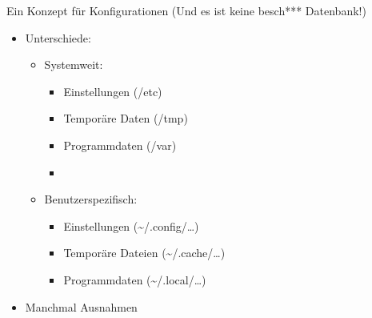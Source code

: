 \begin{frame}{Ein Konzept für Konfigurationen \tiny (Und es ist keine besch*** Datenbank!)}
\begin{itemize}
\item Unterschiede:
	\begin{itemize}
	\item Systemweit:
		\begin{itemize}
		\item Einstellungen (/etc)
		\item Temporäre Daten (/tmp)
		\item Programmdaten (/var)
		\item 
		\end{itemize}
	\item Benutzerspezifisch:
	\begin{itemize}
		\item Einstellungen (\textasciitilde/.config/…)
		\item Temporäre Dateien (\textasciitilde/.cache/…)
		\item Programmdaten (\textasciitilde/.local/…)	
	\end{itemize}
	\end{itemize}
\item Manchmal Ausnahmen
\end{itemize}
\end{frame}